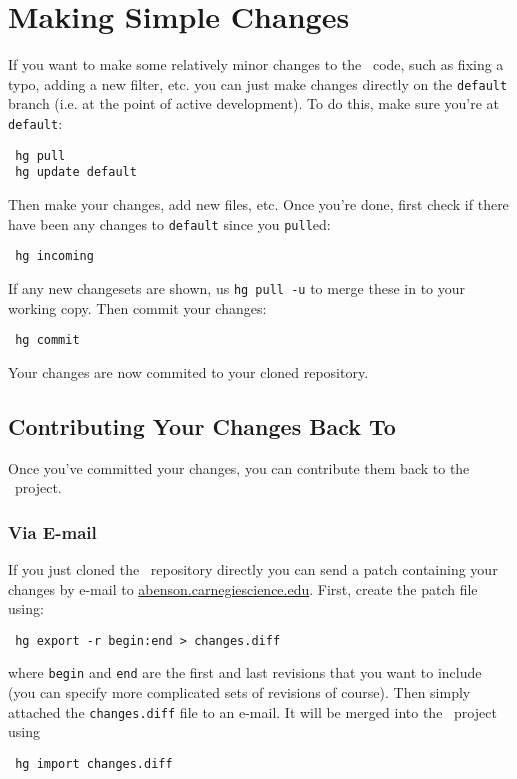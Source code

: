 \section{Making Simple Changes}

If you want to make some relatively minor changes to the \glc\ code, such as fixing a typo, adding a new filter, etc. you can just make changes directly on the {\tt default} branch (i.e. at the point of active development). To do this, make sure you're at {\tt default}:
\begin{verbatim}
 hg pull
 hg update default
\end{verbatim}
Then make your changes, add new files, etc. Once you're done, first check if there have been any changes to {\tt default} since you {\tt pull}ed:
\begin{verbatim}
 hg incoming
\end{verbatim}
If any new changesets are shown, us {\tt hg pull -u} to merge these in to your working copy. Then commit your changes:
\begin{verbatim}
 hg commit
\end{verbatim}
Your changes are now commited to your cloned repository.

\subsection{Contributing Your Changes Back To \glc}

Once you've committed your changes, you can contribute them back to the \glc\ project.

\subsubsection{Via E-mail}

If you just cloned the \glc\ repository directly you can send a patch containing your changes by e-mail to \href{mailto:abenson@obs.carnegiescience.edu}{abenson\@obs.carnegiescience.edu}. First, create the patch file using:
\begin{verbatim}
 hg export -r begin:end > changes.diff
\end{verbatim}
where {\tt begin} and {\tt end} are the first and last revisions that you want to include (you can specify more complicated sets of revisions of course). Then simply attached the {\tt changes.diff} file to an e-mail. It will be merged into the \glc\ project using
\begin{verbatim}
 hg import changes.diff
\end{verbatim}

